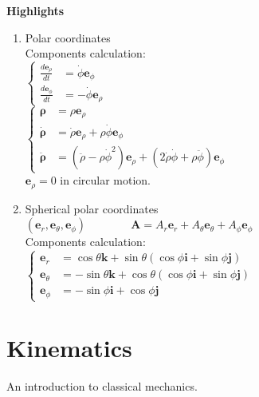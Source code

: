 \documentclass[11pt, a4paper, oneside]{book}
\numberwithin{equation}{section}%
\begin{document}
\textbf{Highlights}
\begin{enumerate}
	\item Polar coordinates\\
	Components calculation:\\
	$\left\{\begin{aligned}
	\frac{d\bm{e}_\rho}{dt} &= \dot{\phi}\bm{e}_\phi\\
	\frac{d\bm{e}_\phi}{dt} &= -\dot{\phi}\bm{e}_\rho
	\end{aligned}\right.$\\
	$\left\{\begin{aligned}
	\bm{\rho} &= \rho \bm{e}_\rho\\
	\dot{\bm{\rho}} &= \dot{\rho} \bm{e}_\rho + \rho \dot{\phi} \bm{e}_\phi\\
	\ddot{\bm{\rho}} &= (\ddot{\rho} - \rho\dot{\phi}^2 )\bm{e}_\rho + (2\dot{\rho}\dot{\phi} + \rho\ddot{\phi})\bm{e}_\phi
	\end{aligned}\right.$\\
	$ \bm{e}_\rho = 0 $ in circular motion.

	\item Spherical polar coordinates\\
	$(\bm{e}_r, \bm{e}_\theta, \bm{e}_\phi)$~~~~~~~~$\bm{A} = A_r\bm{e}_r + A_\theta\bm{e}_\theta + A_\phi\bm{e}_\phi $\\
	Components calculation:\\
	$\left\{
	\begin{aligned}
	\bm{e}_r &= \cos\theta\bm{k} + \sin\theta(\cos\phi\bm{i} + \sin\phi\bm{j})\\
	\bm{e}_\theta &= -\sin\theta\bm{k} + \cos\theta(\cos\phi\bm{i} + \sin\phi\bm{j})\\
	\bm{e}_\phi &= -\sin\phi\bm{i} + \cos\phi\bm{j}
	\end{aligned}
	\right.$\\
\end{enumerate}

\section{Kinematics}

An introduction to classical mechanics. \\
\end{document}
